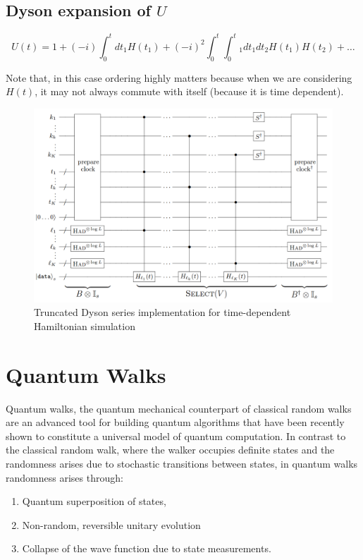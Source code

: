 \documentclass[
10pt, %
a4paper, %
oneside, %
headinclude,footinclude, %
BCOR5mm, %
]{scrartcl}
\begin{document}
\subsection{Dyson expansion of $U$}
$$U(t) = 1 + (-i) \int_0^t dt_1H(t_1) + (-i)^2 \int_0^t \int_0^t_1 dt_1 dt_2 H(t_1) H(t_2) + \ldots$$

Note that, in this case ordering highly matters because when we are considering $H(t)$, it may not always commute with itself (because it is time dependent).

\begin{figure}[H]
    \centering
    \includegraphics[width=\linewidth]{images/trunc.png}
    \caption{Truncated Dyson series implementation for time-dependent Hamiltonian simulation}
\end{figure}

\section{Quantum Walks}

Quantum walks, the quantum mechanical counterpart of classical random walks are an advanced tool for building quantum algorithms that have been recently shown to constitute a universal model of quantum computation. In contrast to the classical random walk, where the walker occupies definite states and the randomness arises due to stochastic transitions between states, in quantum walks randomness arises through:
\begin{enumerate}
    \item Quantum superposition of states,
    \item Non-random, reversible unitary evolution
    \item Collapse of the wave function due to state measurements.
\end{enumerate}
\end{document}
